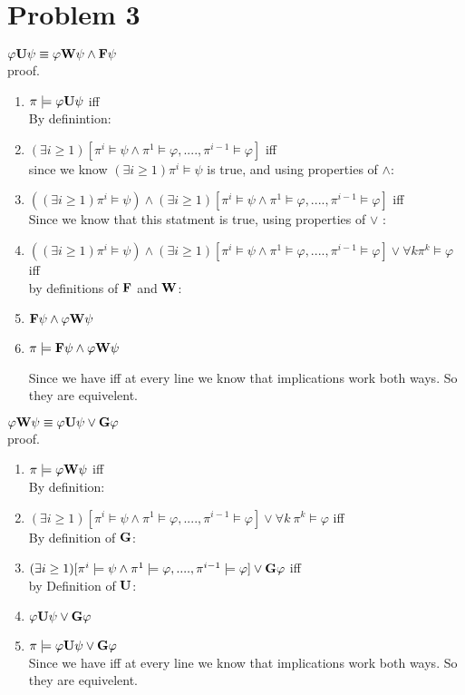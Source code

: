 \documentclass[11pt,leqno,fleqn]{article}
\begin{document}
\section{Problem 3}
$\varphi \bold{U} \psi \equiv \varphi \bold{W} \psi \land \bold{F}\psi$\\
proof.\\
\begin{enumerate}[(1)]

\item $\pi \models \varphi \bold{U} \psi$ iff\\
By definintion:
\item $(\exists i \geq 1) [ \pi^i \models \psi \land \pi^1 \models \varphi, ....,\pi^{i-1} \models \varphi ]$ iff\\
since we know $(\exists i \geq 1)  \pi^i \models \psi$ is true, and using properties of $\land$:
\item $((\exists i \geq 1)  \pi^i \models \psi) \land (\exists i \geq 1) [ \pi^i \models \psi \land \pi^1 \models \varphi, ....,\pi^{i-1} \models \varphi ]$ iff\\
Since we know that this statment is true, using properties of $\lor$ :
\item $((\exists i \geq 1)  \pi^i \models \psi) \land (\exists i \geq 1) [ \pi^i \models \psi \land \pi^1 \models \varphi, ....,\pi^{i-1} \models \varphi ] \lor \forall k \pi^k \models \varphi$ iff\\
by definitions of $\bold{F}$ and $\bold{W}$:
\item $\bold{F}\psi \land \varphi \bold{W} \psi$
\item $\pi \models \bold{F}\psi \land \varphi \bold{W} \psi $

Since we have iff at every line we know that implications work both ways. So they are equivelent.
 \end{enumerate}
 $\varphi \bold{W} \psi \equiv \varphi \bold{U} \psi \lor \bold{G}\varphi$\\
proof.\\
 \begin{enumerate}[(1)]
 \item $\pi \models \varphi \bold{W} \psi$ iff\\
 By definition:
 
 \item $(\exists i \geq 1) [ \pi^i \models \psi \land \pi^1 \models \varphi, ....,\pi^{i-1} \models \varphi ] \lor \forall k \ \pi^k \models \varphi$ iff\\
 By definition of $\bold{G}$:
 
 \item $(\exists i \geq 1) [ \pi^i \models \psi \land \pi^1 \models \varphi, ....,\pi^{i-1} \models \varphi ] \lor \bold{G}\varphi$ iff\\
 by Definition of $\bold{U}$:
 
 \item $\varphi \bold{U}  \psi  \lor \bold{G}\varphi $ 
 \item $\pi \models \varphi \bold{U}  \psi  \lor \bold{G}\varphi$\\
 Since we have iff at every line we know that implications work both ways. So they are equivelent.
  \end{enumerate}
\end{document}
